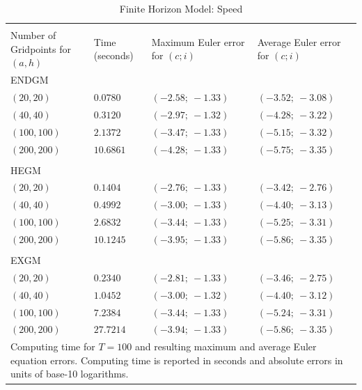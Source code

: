 \documentclass[a4paper,12pt]{article}%
\begin{document}
\begin{table}[htb] \centering
\caption{Finite Horizon Model: Speed}
\begin{tabular}
[c]{p{4cm}||p{2cm}|p{3cm}|p{3cm}}
\multicolumn{4}{p{12cm}}{}\\
Number of Gridpoints for $(a,h)$ & Time (seconds) & Maximum Euler error for $\left( c;i \right)$ & Average Euler error for $\left( c;i \right)$ \\ \hline
ENDGM &  &  & \\
$\left( 20,20 \right)$ & $0.0780$ & $(-2.58;\ -1.33)$ & $(-3.52;\ -3.08)$ \\
$\left( 40,40 \right)$ & $0.3120$ & $(-2.97;\ -1.32)$ & $(-4.28;\ -3.22)$ \\
$\left( 100,100 \right)$ & $2.1372$ & $(-3.47;\ -1.33)$ & $(-5.15;\ -3.32)$ \\
$\left( 200,200 \right)$ & $10.6861$ & $(-4.28;\ -1.33)$ & $(-5.75;\ -3.35)$ \\
&  &  & \\ \hline
HEGM &  &  &  \\
$\left( 20,20 \right)$ & $0.1404$ & $(-2.76;\ -1.33)$ & $(-3.42;\ -2.76)$ \\
$\left( 40,40 \right)$ & $0.4992$ & $(-3.00;\ -1.33)$ & $(-4.40;\ -3.13)$ \\
$\left( 100,100 \right)$ & $2.6832$ & $(-3.44;\ -1.33)$ & $(-5.25;\ -3.31)$ \\
$\left( 200,200 \right)$ & $10.1245$ & $(-3.95;\ -1.33)$ & $(-5.86;\ -3.35)$ \\
&  &  & \\ \hline
EXGM &  &  & \\
$\left( 20,20 \right)$ & $0.2340$ & $(-2.81;\ -1.33)$ & $(-3.46;\ -2.75)$ \\
$\left( 40,40 \right)$ & $1.0452$ & $(-3.00;\ -1.32)$ & $(-4.40;\ -3.12)$ \\
$\left( 100,100 \right)$ & $7.2384$ & $(-3.44;\ -1.33)$ & $(-5.24;\ -3.31)$ \\
$\left( 200,200 \right)$ & $27.7214$ & $(-3.94;\ -1.33)$ & $(-5.86;\ -3.35)$ \\ \hline
\multicolumn{4}{p{12cm}}{\footnotesize{Computing time for $T=100$ and resulting maximum and average Euler equation errors. Computing time is reported in seconds and absolute errors in units of base-10 logarithms.}}
\end{tabular}
\label{results_finite}
\end{table}
\end{document}
